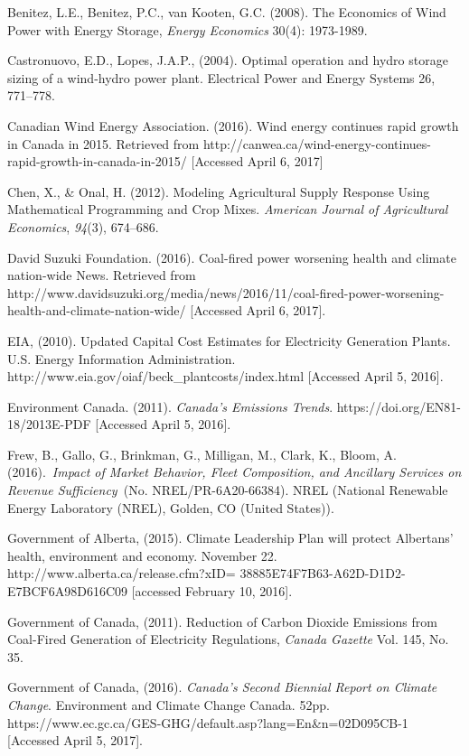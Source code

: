 \documentclass[10pt,letter]{article}
\begin{document}
Benitez, L.E., Benitez, P.C., van Kooten, G.C. (2008). The Economics of
Wind Power with Energy Storage, \emph{Energy Economics} 30(4):
1973-1989.

Castronuovo, E.D., Lopes, J.A.P., (2004). Optimal operation and hydro
storage sizing of a wind-hydro power plant. Electrical Power and Energy
Systems 26, 771--778.

Canadian Wind Energy Association. (2016). Wind energy continues rapid
growth in Canada in 2015. Retrieved from
http://canwea.ca/wind-energy-continues-rapid-growth-in-canada-in-2015/
{[}Accessed April 6, 2017{]}

Chen, X., \& Onal, H. (2012). Modeling Agricultural Supply Response
Using Mathematical Programming and Crop Mixes. \emph{American Journal of
Agricultural Economics}, \emph{94}(3), 674--686.

David Suzuki Foundation. (2016). Coal-fired power worsening health and
climate nation-wide \textbar{} News. Retrieved from
http://www.davidsuzuki.org/media/news/2016/11/coal-fired-power-worsening-health-and-climate-nation-wide/
{[}Accessed April 6, 2017{]}.

EIA, (2010). Updated Capital Cost Estimates for Electricity Generation
Plants. U.S. Energy Information Administration.
http://www.eia.gov/oiaf/beck\_plantcosts/index.html {[}Accessed April 5,
2016{]}.

Environment Canada. (2011). \emph{Canada's Emissions Trends}.
https://doi.org/EN81-18/2013E-PDF {[}Accessed April 5, 2016{]}.

Frew, B., Gallo, G., Brinkman, G., Milligan, M., Clark, K., Bloom, A.
(2016).~\emph{Impact of Market Behavior, Fleet Composition, and
Ancillary Services on Revenue Sufficiency~}(No. NREL/PR-6A20-66384).
NREL (National Renewable Energy Laboratory (NREL), Golden, CO (United
States)).

Government of Alberta, (2015). Climate Leadership Plan will protect
Albertans' health, environment and economy. November 22.
http://www.alberta.ca/release.cfm?xID=
38885E74F7B63-A62D-D1D2-E7BCF6A98D616C09 {[}accessed February 10,
2016{]}.

Government of Canada, (2011). Reduction of Carbon Dioxide Emissions from
Coal-Fired Generation of Electricity Regulations, \emph{Canada Gazette}
Vol. 145, No. 35.

Government of Canada, (2016). \emph{Canada's Second Biennial Report on
Climate Change}. Environment and Climate Change Canada. 52pp.
https://www.ec.gc.ca/GES-GHG/default.asp?lang=En\&n=02D095CB-1
{[}Accessed April 5, 2017{]}.
\end{document}
